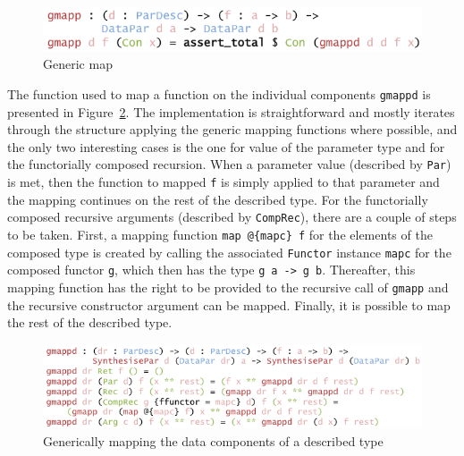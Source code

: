 \documentclass{ituthesis}
\newcommand{\ttconstructor}[1]{\textcolor{constructor-color}{\texttt{#1}}}
\newcommand{\ttdec}[1]{\textcolor{declared-var-color}{\texttt{#1}}}
\newcommand{\ttvar}[1]{\textcolor{local-var-color}{\texttt{#1}}}
\theoremstyle{break}
\begin{document}
\begin{figure}[ht]
\begin{center}
    \includegraphics[scale=0.5]{Figures/GenericMap.png}
\end{center}
\caption{Generic map}
\label{fig:mapgen}
\end{figure}

The function used to map a function on the individual components \ttdec{gmappd} is presented in Figure~\ref{fig:mapgendesc}.
The implementation is straightforward and mostly iterates through the structure applying the generic mapping functions where possible, and the only two interesting cases is the one for value of the parameter type
and for the functorially composed recursion.
When a parameter value (described by \ttconstructor{Par}) is met, then the function to mapped \ttvar{f} is simply applied to that parameter and the mapping continues on the rest of the described type.
For the functorially composed recursive arguments (described by \ttconstructor{CompRec}), there are a couple of steps to be taken.
First, a mapping function \ttdec{map}~\texttt{@\{}\ttvar{mapc}\texttt{\}}~\ttvar{f} for the elements of the composed type is created by calling the associated \ttvar{Functor} instance \ttvar{mapc} for the composed functor \ttvar{g}, which then has the type \ttvar{g}~\ttvar{a}~\texttt{->}~\ttvar{g}~\ttvar{b}.
Thereafter, this mapping function has the right to be provided to the recursive call of \ttdec{gmapp} and the recursive constructor argument can be mapped.
Finally, it is possible to map the rest of the described type.

\begin{figure}[ht]
\begin{center}
    \includegraphics[scale=0.5]{Figures/GenericMapDesc.png}
\end{center}
\caption{Generically mapping the data components of a described type}
\label{fig:mapgendesc}
\end{figure}
\end{document}
